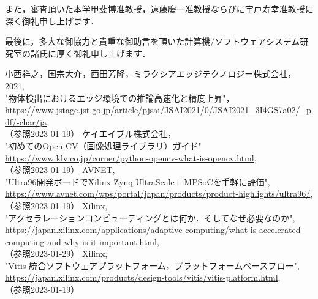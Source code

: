 \documentclass[11pt,a4j]{jreport}
\begin{document}
また，審査頂いた本学甲斐博准教授，遠藤慶一准教授ならびに宇戸寿幸准教授に深く御礼申し上げます．

最後に，多大な御協力と貴重な御助言を頂いた計算機/ソフトウェアシステム研究室の諸氏に厚く御礼申し上げます．
\renewcommand{\bibname}{参考文献} %
\begin{thebibliography}{99}
   小西祥之，国宗大介，西田芳隆，ミラクシアエッジテクノロジー株式会社， \\2021, \\"物体検出におけるエッジ環境での推論高速化と精度上昇"， \\\url{https://www.jstage.jst.go.jp/article/pjsai/JSAI2021/0/JSAI2021_3I4GS7a02/_pdf/-char/ja}, \\（参照2023-01-19）
   ケイエイブル株式会社， \\"初めてのOpen CV（画像処理ライブラリ）ガイド" \\\url{https://www.klv.co.jp/corner/python-opencv-what-is-opencv.html}, \\（参照2023-01-19）
   AVNET, \\"Ultra96開発ボードでXilinx Zynq UltraScale+ MPSoCを手軽に評価", \\\url{https://www.avnet.com/wps/portal/japan/products/product-highlights/ultra96/}, \\（参照2023-01-19）
   Xilinx, \\"アクセラレーションコンピューティングとは何か．そしてなぜ必要なのか", \\\url{https://japan.xilinx.com/applications/adaptive-computing/what-is-accelerated-computing-and-why-is-it-important.html}, \\（参照2023-01-29）
   Xilinx, \\"Vitis 統合ソフトウェアプラットフォーム，プラットフォームベースフロー", \\\url{https://japan.xilinx.com/products/design-tools/vitis/vitis-platform.html}, \\（参照2023-01-19）

\end{thebibliography}
\end{document}
